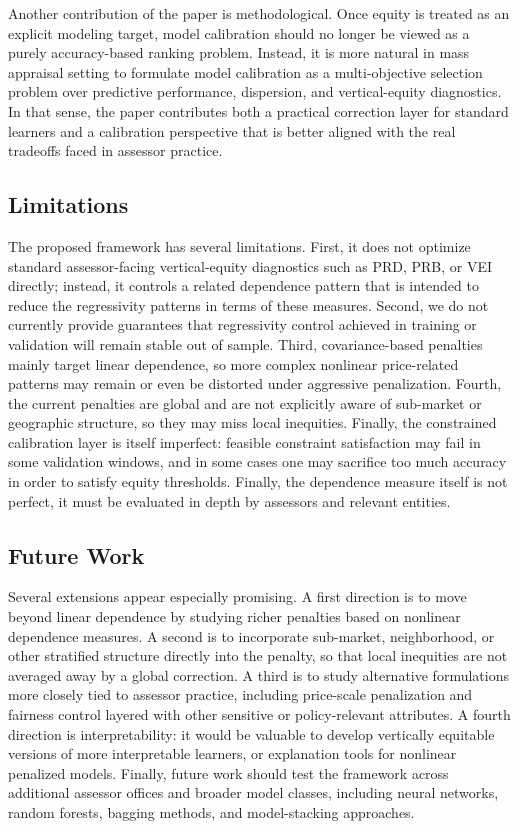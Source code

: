 \documentclass[12pt, draft]{article}
\theoremstyle{plain}
\theoremstyle{definition}
\newcommand{\1}{\mathbf{1}}
\begin{document}
Another contribution of the paper is methodological. Once equity is treated as an explicit modeling target, model calibration should no longer be viewed as a purely accuracy-based ranking problem. Instead, it is more natural in mass appraisal setting to formulate model calibration as a multi-objective selection problem over predictive performance, dispersion, and vertical-equity diagnostics. In that sense, the paper contributes both a practical correction layer for standard learners and a calibration perspective that is better aligned with the real tradeoffs faced in assessor practice.

\subsection{Limitations}

The proposed framework has several limitations. First, it does not optimize standard assessor-facing vertical-equity diagnostics such as PRD, PRB, or VEI directly; instead, it controls a related dependence pattern that is intended to reduce the regressivity patterns in terms of these measures. Second, we do not currently provide guarantees that regressivity control achieved in training or validation will remain stable out of sample. Third, covariance-based penalties mainly target linear dependence, so more complex nonlinear price-related patterns may remain or even be distorted under aggressive penalization. Fourth, the current penalties are global and are not explicitly aware of sub-market or geographic structure, so they may miss local inequities. Finally, the constrained calibration layer is itself imperfect: feasible constraint satisfaction may fail in some validation windows, and in some cases one may sacrifice too much accuracy in order to satisfy equity thresholds. Finally, the dependence measure itself is not perfect, it must be evaluated in depth by assessors and relevant entities.

\subsection{Future Work}

Several extensions appear especially promising. A first direction is to move beyond linear dependence by studying richer penalties based on nonlinear dependence measures. A second is to incorporate sub-market, neighborhood, or other stratified structure directly into the penalty, so that local inequities are not averaged away by a global correction. A third is to study alternative formulations more closely tied to assessor practice, including price-scale penalization and fairness control layered with other sensitive or policy-relevant attributes. A fourth direction is interpretability: it would be valuable to develop vertically equitable versions of more interpretable learners, or explanation tools for nonlinear penalized models. Finally, future work should test the framework across additional assessor offices and broader model classes, including neural networks, random forests, bagging methods, and model-stacking approaches.
\end{document}
